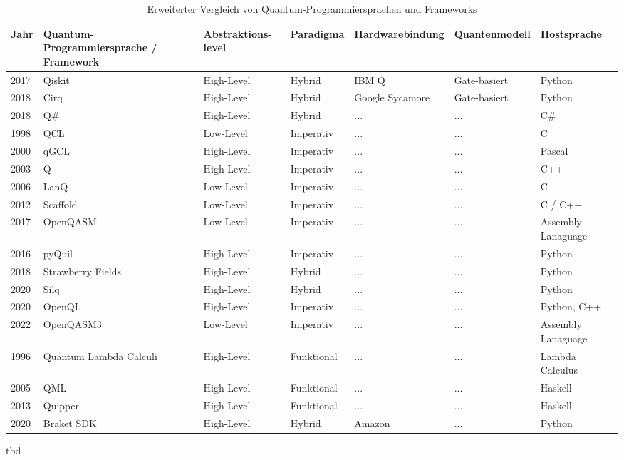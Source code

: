\begin{table}[H]
\centering
\footnotesize
\begin{tabular}{|p{1cm}|p{3cm}|p{2cm}|l|l|p{2cm}|p{2cm}|}
\hline
\textbf{Jahr} & 
\textbf{Quantum-Programmiersprache / Framework} & 
\textbf{Abstraktions-level} & 
\textbf{Paradigma} & 
\textbf{Hardwarebindung} & 
\textbf{Quantenmodell} & 
\textbf{Hostsprache} \\
\hline
2017 & Qiskit & High-Level & Hybrid & IBM Q & Gate-basiert & Python \\
\hline
2018 & Cirq & High-Level & Hybrid & Google Sycamore & Gate-basiert & Python \\
\hline
2018 & Q\# & High-Level & Hybrid & ... & ...& C\# \\
\hline
1998 & QCL & Low-Level & Imperativ & ... & ... & C \\
\hline
2000 & qGCL & High-Level & Imperativ & ... & ... & Pascal \\
\hline
2003 & Q & High-Level & Imperativ & ... & ... & C++ \\
\hline
2006 & LanQ & Low-Level & Imperativ & ... & ... & C \\
\hline
2012 & Scaffold & Low-Level & Imperativ & ... & ... & C / C++ \\
\hline
2017 & OpenQASM & Low-Level & Imperativ & ... & ... & Assembly Lanaguage \\
\hline
2016 & pyQuil & High-Level & Imperativ & ... & ... & Python \\
\hline
2018 & Strawberry Fields & High-Level & Hybrid & ... & ... & Python \\
\hline
2020 & Silq & High-Level & Hybrid & ... & ... & Python \\
\hline
2020 & OpenQL & High-Level & Imperativ & ... & ... & Python, C++ \\
\hline
2022 & OpenQASM3 & Low-Level & Imperativ & ... & ... & Assembly Lanaguage \\
\hline
1996 & Quantum Lambda Calculi & High-Level & Funktional & ... & ... & Lambda Calculus \\
\hline
2005 & QML & High-Level & Funktional & ... & ... & Haskell \\
\hline
2013 & Quipper & High-Level & Funktional & ... & ... & Haskell \\
\hline
2020 & Braket SDK & High-Level & Hybrid & Amazon & ... & Python \\




\hline
\end{tabular}
\caption{Erweiterter Vergleich von Quantum-Programmiersprachen und Frameworks}
\label{tab:quantum_languages_full}
\end{table}
tbd

